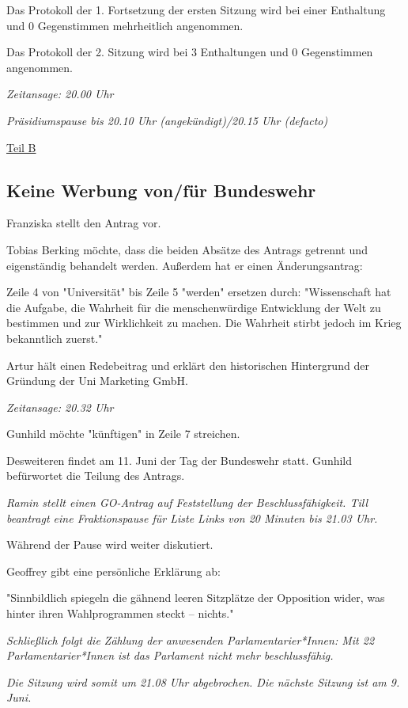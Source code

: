 \documentclass[ngerman,headheight=70pt]{scrartcl}
\begin{document}
    Das Protokoll der 1. Fortsetzung der ersten Sitzung wird bei einer Enthaltung
    und 0 Gegenstimmen mehrheitlich angenommen.

    Das Protokoll der 2. Sitzung  wird bei 3 Enthaltungen und 0 Gegenstimmen
    angenommen.

    \textit{Zeitansage: 20.00 Uhr}

    \textit{Präsidiumspause bis 20.10 Uhr (angekündigt)/20.15 Uhr (defacto)}

    \newpage
    {\Large \underline{Teil B}}


    \subsection{Keine Werbung von/für Bundeswehr}

    Franziska stellt den Antrag vor.

    Tobias Berking möchte, dass die beiden Absätze des Antrags getrennt
    und eigenständig behandelt werden. Außerdem hat er einen Änderungsantrag:

    Zeile 4 von "Universität" bis Zeile 5 "werden" ersetzen durch:
    "Wissenschaft hat die Aufgabe, die Wahrheit für die menschenwürdige
    Entwicklung der Welt zu bestimmen und zur Wirklichkeit zu machen. Die
    Wahrheit stirbt jedoch im Krieg bekanntlich zuerst."

    Artur hält einen Redebeitrag und erklärt den historischen Hintergrund
    der Gründung der Uni Marketing GmbH.

    \textit{Zeitansage: 20.32 Uhr}

    Gunhild möchte "künftigen" in Zeile 7 streichen.

    Desweiteren findet am 11. Juni der Tag der Bundeswehr statt. Gunhild
    befürwortet die Teilung des Antrags.

    \textit{Ramin stellt einen GO-Antrag auf Feststellung der Beschlussfähigkeit.
    Till beantragt eine Fraktionspause für Liste Links von 20 Minuten bis 21.03 Uhr.}

    Während der Pause wird weiter diskutiert.

    Geoffrey gibt eine persönliche Erklärung ab:

    "Sinnbildlich spiegeln die gähnend leeren Sitzplätze der Opposition
    wider, was hinter ihren Wahlprogrammen steckt -- nichts."

    \textit{Schließlich folgt die Zählung der anwesenden Parlamentarier*Innen: Mit 22
    Parlamentarier*Innen ist das Parlament nicht mehr beschlussfähig.}

    \textit{Die Sitzung wird somit um 21.08 Uhr abgebrochen. Die nächste Sitzung
    ist am 9. Juni.}
\end{document}
